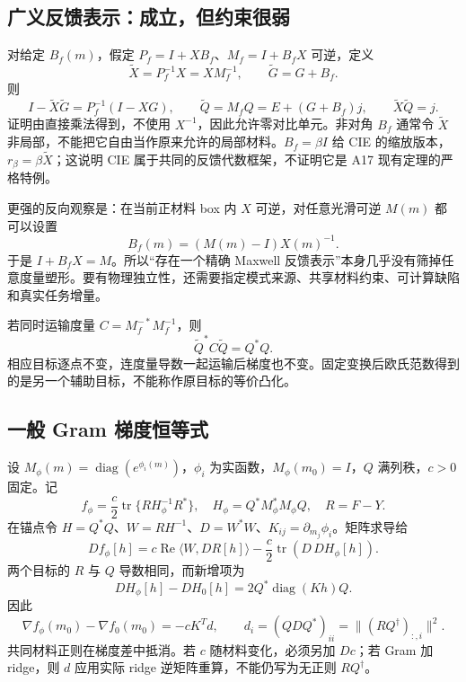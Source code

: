 \documentclass[10pt,a4paper]{article}
\begin{document}
\hypertarget{ux5e7fux4e49ux53cdux9988ux8868ux793aux6210ux7acbux4f46ux7ea6ux675fux5f88ux5f31}{%
\subsection{广义反馈表示：成立，但约束很弱}\label{ux5e7fux4e49ux53cdux9988ux8868ux793aux6210ux7acbux4f46ux7ea6ux675fux5f88ux5f31}}

对给定 \(B_f(m)\)，假定 \(P_f=I+XB_f\)、\(M_f=I+B_fX\) 可逆，定义
\[\widetilde X=P_f^{-1}X=XM_f^{-1},\qquad \widetilde G=G+B_f.\] 则
\[I-\widetilde X\widetilde G=P_f^{-1}(I-XG),\qquad
\widetilde Q=M_fQ=E+(G+B_f)j,\qquad \widetilde X\widetilde Q=j.\]
证明由直接乘法得到，不使用 \(X^{-1}\)，因此允许零对比单元。非对角
\(B_f\) 通常令 \(\widetilde X\)
非局部，不能把它自由当作原来允许的局部材料。\(B_f=\beta I\) 给 CIE
的缩放版本，\(r_\beta=\beta\widetilde X\)；这说明 CIE
属于共同的反馈代数框架，不证明它是 A17 现有定理的严格特例。

更强的反向观察是：在当前正材料 box 内 \(X\) 可逆，对任意光滑可逆
\(M(m)\) 都可以设置 \[B_f(m)=(M(m)-I)X(m)^{-1}.\] 于是
\(I+B_fX=M\)。所以``存在一个精确 Maxwell
反馈表示''本身几乎没有筛掉任意度量塑形。要有物理独立性，还需要指定模式来源、共享材料约束、可计算缺陷和真实任务增量。

若同时运输度量 \(C=M_f^{-*}M_f^{-1}\)，则
\[\widetilde Q^*C\widetilde Q=Q^*Q.\]
相应目标逐点不变，连度量导数一起运输后梯度也不变。固定变换后欧氏范数得到的是另一个辅助目标，不能称作原目标的等价凸化。

\hypertarget{ux4e00ux822c-gram-ux68afux5ea6ux6052ux7b49ux5f0f}{%
\subsection{一般 Gram
梯度恒等式}\label{ux4e00ux822c-gram-ux68afux5ea6ux6052ux7b49ux5f0f}}

设 \(M_\phi(m)=\operatorname{diag}(e^{\phi_i(m)})\)，\(\phi_i\)
为实函数，\(M_\phi(m_0)=I\)，\(Q\) 满列秩，\(c>0\) 固定。记
\[f_\phi=\frac c2\operatorname{tr}\{R H_\phi^{-1}R^*\},\quad
H_\phi=Q^*M_\phi^*M_\phi Q,\quad R=F-Y.\] 在锚点令
\(H=Q^*Q\)、\(W=RH^{-1}\)、\(D=W^*W\)、\(K_{ij}=\partial_{m_j}\phi_i\)。矩阵求导给
\[Df_\phi[h]=c\operatorname{Re}\langle W,DR[h]\rangle
-\frac c2\operatorname{tr}(D\,DH_\phi[h]).\] 两个目标的 \(R\) 与 \(Q\)
导数相同，而新增项为
\[DH_\phi[h]-DH_0[h]=2Q^*\operatorname{diag}(Kh)Q.\] 因此
\[\boxed{\nabla f_\phi(m_0)-\nabla f_0(m_0)=-cK^Td,\qquad
d_i=(QDQ^*)_{ii}=\|(RQ^\dagger)_{:,i}\|^2.}\]
共同材料正则在梯度差中抵消。若 \(c\) 随材料变化，必须另加 \(Dc\)；若
Gram 加 ridge，则 \(d\) 应用实际 ridge 逆矩阵重算，不能仍写为无正则
\(RQ^\dagger\)。
\end{document}
